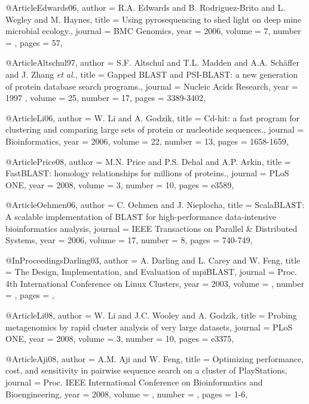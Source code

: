 @Article{Edwards06,
  author = {R.A. Edwards and B. Rodriguez-Brito and L. Wegley and M. Haynes},
  title =  {Using pyrosequencing to shed light on deep mine microbial ecology.},
  journal = {{BMC Genomics}},
  year = {2006},
  volume =  {7},
  number =  {},
  pages =   {57},
}

@Article{Altschul97,
  author = {S.F. Altschul and T.L. Madden and  A.A. Schäffer and  J. Zhang  {\it et al.}},
  title =  {Gapped {BLAST} and {PSI-BLAST}: a new generation of protein database search programs.},
  journal = {Nucleic Acids Research},
  year = {1997 },
  volume =  {25},
  number =  {17},
  pages =   {3389-3402},
}

@Article{Li06,
  author = {W. Li and A. Godzik},
  title =  {Cd-hit: a fast program for clustering and comparing large sets of protein or nucleotide sequences.},
  journal = {Bioinformatics},
  year = {2006},
  volume =  {22},
  number =  {13},
  pages =   {1658-1659},
}

@Article{Price08,
  author = {M.N. Price and P.S. Dehal  and A.P. Arkin},
  title =  {{FastBLAST}: homology relationships for millions of proteins.},
  journal = {PLoS ONE},
  year = {2008},
  volume =  {3},
  number =  {10},
  pages =   {e3589},
}

@Article{Oehmen06,
  author = {C. Oehmen and J. Nieplocha},
  title =  {{ScalaBLAST}: A scalable implementation of {BLAST} for high-performance data-intensive bioinformatics analysis},
  journal = {IEEE Transactions on Parallel \& Distributed Systems},
  year = {2006},
  volume =  {17},
  number =  {8},
  pages =   {740-749},
}

@InProceedings{Darling03,
  author = {A. Darling and L. Carey and W. Feng},
  title =  {The Design, Implementation, and Evaluation of {mpiBLAST}},
  journal = {Proc. 4th International Conference on Linux Clusters},
  year = {2003},
  volume =  {},
  number =  {},
  pages =   {},
}

@Article{Li08,
  author = {W. Li and J.C. Wooley and A. Godzik},
  title =  {Probing metagenomics by rapid cluster analysis of very large datasets},
  journal = {{PLoS ONE}},
  year = {2008},
  volume =  {3},
  number =  {10},
  pages =   {e3375},
}

@Article{Aji08,
  author = {A.M. Aji and W. Feng},
  title =  {Optimizing performance, cost, and sensitivity in pairwise sequence search on a cluster of {PlayStations}},
  journal = {Proc. IEEE International Conference on Bioinformatics and Bioengineering},
  year = {2008},
  volume =  {},
  number =  {},
  pages =   {1-6},
}

